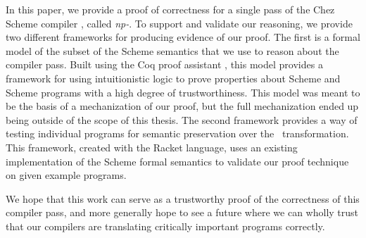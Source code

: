 In this paper, we provide a proof of correctness for a single pass of the Chez Scheme compiler \cite{dybvig2011chez}, called \textit{np-}\caname. To support and validate our reasoning, we provide two different frameworks for producing evidence of our proof. The first is a formal model of the subset of the Scheme semantics that we use to reason about the compiler pass. Built using the Coq proof assistant \cite{barras_coq_1997}, this model provides a framework for using intuitionistic logic to prove properties about Scheme and Scheme programs with a high degree of trustworthiness. This model was meant to be the basis of a mechanization of our proof, but the full mechanization ended up being outside of the scope of this thesis. The second framework provides a way of testing individual programs for semantic preservation over the \caname\ transformation. This framework, created with the Racket \cite{felleisen2015racket} language, uses an existing implementation of the Scheme formal semantics to validate our proof technique on given example programs.

We hope that this work can serve as a trustworthy proof of the correctness of this compiler pass, and more generally hope to see a future where we can wholly trust that our compilers are translating critically important programs correctly.